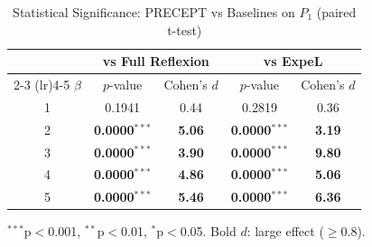 \begin{table}[t]
\centering
\caption{Statistical Significance: PRECEPT vs Baselines on $P_1$ (paired t-test)}
\label{tab:exp3_significance}
\begin{tabular}{c cc cc}
\toprule
& \multicolumn{2}{c}{\textbf{vs Full Reflexion}} & \multicolumn{2}{c}{\textbf{vs ExpeL}} \\
\cmidrule(lr){2-3} \cmidrule(lr){4-5}
$\beta$ & $p$-value & Cohen's $d$ & $p$-value & Cohen's $d$ \\
\midrule
1 & 0.1941 & 0.44 & 0.2819 & 0.36 \\
2 & \textbf{0.0000}$^{***}$ & \textbf{5.06} & \textbf{0.0000}$^{***}$ & \textbf{3.19} \\
3 & \textbf{0.0000}$^{***}$ & \textbf{3.90} & \textbf{0.0000}$^{***}$ & \textbf{9.80} \\
4 & \textbf{0.0000}$^{***}$ & \textbf{4.86} & \textbf{0.0000}$^{***}$ & \textbf{5.06} \\
5 & \textbf{0.0000}$^{***}$ & \textbf{5.46} & \textbf{0.0000}$^{***}$ & \textbf{6.36} \\
\bottomrule
\end{tabular}
\vspace{2mm}
\footnotesize
$^{***}$p$<$0.001, $^{**}$p$<$0.01, $^{*}$p$<$0.05. Bold $d$: large effect ($\geq$0.8).
\end{table}
